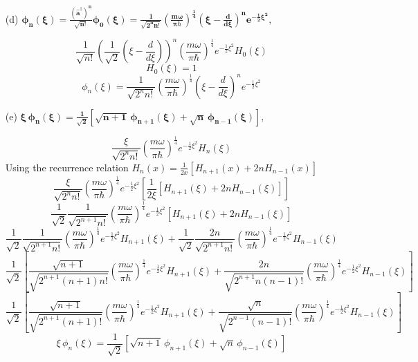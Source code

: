 \documentclass{article}
\begin{document}
{\begin{enumerate}
		\item[(d)] $\bm{ \phi_n(\xi) = \frac{(\hat{a}^{\dagger})^n}{\sqrt{n!}} \phi_0(\xi) = \frac{1}{\sqrt{2^n n!}} \left( \frac{m\omega}{\pi \hbar} \right)^{\frac{1}{4}} \left( \xi - \frac{d}{d\xi} \right)^n e^{-\frac{1}{2}\xi^2}, }$
		
		\[
			\frac{1}{\sqrt{n!}} \left( \frac{1}{\sqrt{2}} \left( \xi - \frac{d}{d\xi} \right) \right)^n \left( \frac{m\omega}{\pi \hbar} \right)^{\frac{1}{4}} e^{-\frac{1}{2}\xi^2} H_0(\xi)
		\]
		\[
			H_0(\xi) = 1
		\]
		\[
			\phi_n(\xi) = \frac{1}{\sqrt{2^n n!}} \left( \frac{m\omega}{\pi \hbar} \right)^{\frac{1}{4}} \left( \xi - \frac{d}{d\xi} \right)^n  e^{-\frac{1}{2}\xi^2}	
		\]
		
		\item[(e)] $\bm{ \xi \, \phi_n(\xi) = \frac{1}{\sqrt{2}} \left[ \sqrt{n+1} \, \phi_{n+1}(\xi) + \sqrt{n} \, \phi_{n-1}(\xi) \right], }$
		
		\[
			\frac{\xi}{\sqrt{2^n n!}}\left( \frac{m\omega}{\pi \hbar} \right)^{\frac{1}{4}} e^{-\frac{1}{2}\xi^2} H_n(\xi)
		\]
		Using the recurrence relation $H_n(x) = \frac{1}{2x}\left[ H_{n+1}(x) + 2nH_{n-1}(x) \right]$
		\[
			\frac{\xi}{\sqrt{2^n n!}}\left( \frac{m\omega}{\pi \hbar} \right)^{\frac{1}{4}} e^{-\frac{1}{2}\xi^2} \left[ \frac{1}{2\xi} \left[ H_{n+1}(\xi) + 2nH_{n-1}(\xi) \right] \right]
		\]
		\[
			\frac{1}{\sqrt{2}}\frac{1}{\sqrt{2^{n+1} n!}}\left( \frac{m\omega}{\pi \hbar} \right)^{\frac{1}{4}} e^{-\frac{1}{2}\xi^2} \left[ H_{n+1}(\xi) + 2nH_{n-1}(\xi) \right]
		\]
		\[
			\frac{1}{\sqrt{2}}\frac{1}{\sqrt{2^{n+1} n!}}\left( \frac{m\omega}{\pi \hbar} \right)^{\frac{1}{4}} e^{-\frac{1}{2}\xi^2} H_{n+1}(\xi) + \frac{1}{\sqrt{2}}\frac{2n}{\sqrt{2^{n+1} n!}}\left( \frac{m\omega}{\pi \hbar} \right)^{\frac{1}{4}} e^{-\frac{1}{2}\xi^2} H_{n-1}(\xi)
		\]
		\[
			\frac{1}{\sqrt{2}} \left[ \frac{\sqrt{n+1}}{\sqrt{2^{n+1} (n+1)n!}}\left( \frac{m\omega}{\pi \hbar} \right)^{\frac{1}{4}} e^{-\frac{1}{2}\xi^2} H_{n+1}(\xi) + \frac{2n}{\sqrt{2^{n+1} n(n-1)!}}\left( \frac{m\omega}{\pi \hbar} \right)^{\frac{1}{4}} e^{-\frac{1}{2}\xi^2} H_{n-1}(\xi) \right]
		\]
		\[
			\frac{1}{\sqrt{2}} \left[ \frac{\sqrt{n+1}}{\sqrt{2^{n+1} (n+1)!}}\left( \frac{m\omega}{\pi \hbar} \right)^{\frac{1}{4}} e^{-\frac{1}{2}\xi^2} H_{n+1}(\xi) + \frac{\sqrt{n}}{\sqrt{2^{n-1} (n-1)!}}\left( \frac{m\omega}{\pi \hbar} \right)^{\frac{1}{4}} e^{-\frac{1}{2}\xi^2} H_{n-1}(\xi) \right]
		\]
		\[
			\xi \, \phi_n(\xi) = \frac{1}{\sqrt{2}} \left[ \sqrt{n+1} \, \phi_{n+1}(\xi) + \sqrt{n} \, \phi_{n-1}(\xi) \right]
		\]
		

\end{enumerate}}
\end{document}

